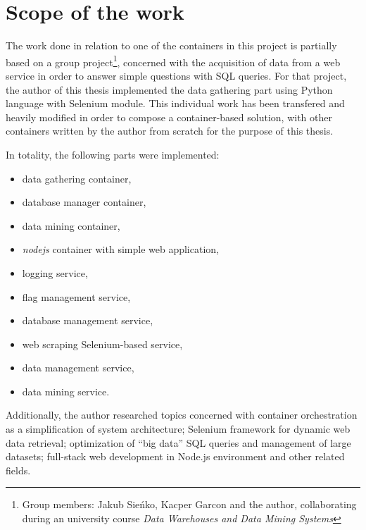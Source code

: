 \section{Scope of the work}
The work done in relation to one of the containers in this project is partially based on a group project\footnote{Group members: Jakub Sieńko, Kacper Garcon and the author, collaborating during an university course \textit{Data Warehouses and Data Mining Systems}}, concerned with the acquisition of data from a web service in order to answer simple questions with SQL queries. For that project, the author of this thesis implemented the data gathering part using Python language with Selenium module. This individual work has been transfered and heavily modified in order to compose a container-based solution, with other containers written by the author from scratch for the purpose of this thesis. \par
In totality, the following parts were implemented:
\begin{itemize}
    \item data gathering container,
    \item database manager container,
    \item data mining container,
    \item \textit{nodejs} container with simple web application,
    \item logging service,
    \item flag management service,
    \item database management service,
    \item web scraping Selenium-based service,
    \item data management service,
    \item data mining service.
\end{itemize}
Additionally, the author researched topics concerned with container orchestration as a simplification of system architecture; Selenium framework for dynamic web data retrieval; optimization of ``big data'' SQL queries and management of large datasets; full-stack web development in Node.js environment and other related fields.


